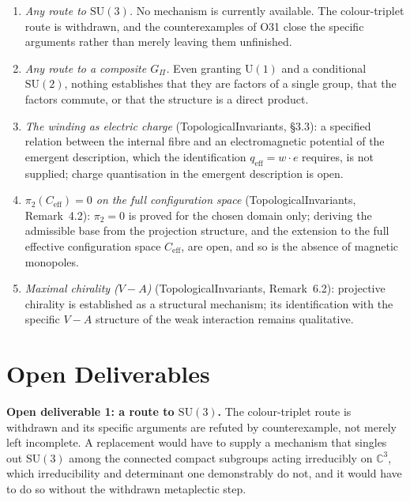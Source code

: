 \documentclass[11pt,a4paper]{article}
\theoremstyle{definition}
\newcommand{\SU}{\mathrm{SU}}
\newcommand{\UU}{\mathrm{U}}
\newcommand{\Gpi}{G_{\Pi}}
\newcommand{\Ceff}{C_{\mathrm{eff}}}
\begin{document}
      \begin{enumerate}
        \item \textit{Any route to $\SU(3)$.} No mechanism is currently available.
        The colour-triplet route is withdrawn, and the counterexamples of O31 close the specific
        arguments rather than merely leaving them unfinished.

        \item \textit{Any route to a composite $\Gpi$.} Even granting $\UU(1)$ and a conditional
        $\SU(2)$, nothing establishes that they are factors of a single group, that the factors
        commute, or that the structure is a direct product.

        \item \textit{The winding as electric charge}
        (TopologicalInvariants, §3.3):
        a specified relation between the internal fibre and an electromagnetic potential of the
        emergent description, which the identification $q_{\mathrm{eff}} = w \cdot e$ requires, is not
        supplied; charge quantisation in the emergent description is open.

        \item \textit{$\pi_2(\Ceff) = 0$ on the full configuration space}
        (TopologicalInvariants, Remark~4.2):
        $\pi_2 = 0$ is proved for the chosen domain only; deriving the admissible base from the
        projection structure, and the extension to the full effective configuration space $\Ceff$,
        are open, and so is the absence of magnetic monopoles.

        \item \textit{Maximal chirality ($V - A$)} (TopologicalInvariants, Remark~6.2):
        projective chirality is established as a structural mechanism; its identification with the
        specific $V - A$ structure of the weak interaction remains qualitative.
      \end{enumerate}

  \section{Open Deliverables}
    \label{sec:open}

    \textbf{Open deliverable 1: a route to $\SU(3)$.}
    The colour-triplet route is withdrawn and its specific arguments are refuted by
    counterexample, not merely left incomplete.
    A replacement would have to supply a mechanism that singles out $\SU(3)$ among the connected
    compact subgroups acting irreducibly on $\mathbb{C}^3$, which irreducibility and determinant
    one demonstrably do not, and it would have to do so without the withdrawn metaplectic step.
\end{document}
